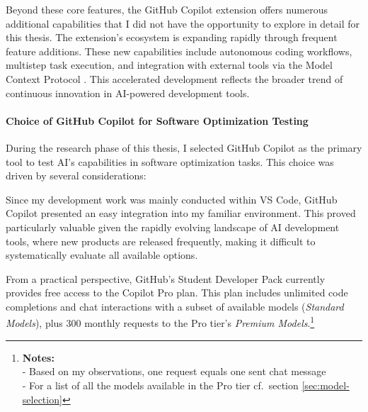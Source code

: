 Beyond these core features, the GitHub Copilot extension offers numerous additional capabilities that I did not have the opportunity to explore in detail for this thesis.
The extension's ecosystem is expanding rapidly through frequent feature additions. 
These new capabilities include autonomous coding workflows, multistep task execution, and integration with external tools via the Model Context Protocol \cite{model-context-protocol}. 
This accelerated development reflects the broader trend of continuous innovation in AI-powered development tools.

\vspace{-0.8\baselineskip}
\paragraph{Choice of GitHub Copilot for Software Optimization Testing}
During the research phase of this thesis, I selected GitHub Copilot as the primary tool to test AI's capabilities in software optimization tasks.
This choice was driven by several considerations:

Since my development work was mainly conducted within VS Code, GitHub Copilot presented an easy integration into my familiar environment. 
This proved particularly valuable given the rapidly evolving landscape of AI development tools, where new products are released frequently, making it difficult to systematically evaluate all available options.

From a practical perspective, GitHub's Student Developer Pack \cite{github-student-dev-pack} currently provides free access to the Copilot Pro plan. 
This plan includes unlimited code completions and chat interactions with a subset of available models (\emph{Standard Models}), plus 300 monthly requests to the Pro tier's \emph{Premium Models}.\footnote{%
\textbf{Notes:}\\
- Based on my observations, one request equals one sent chat message\\
- For a list of all the models available in the Pro tier cf.\ section \ref{sec:model-selection}
}

